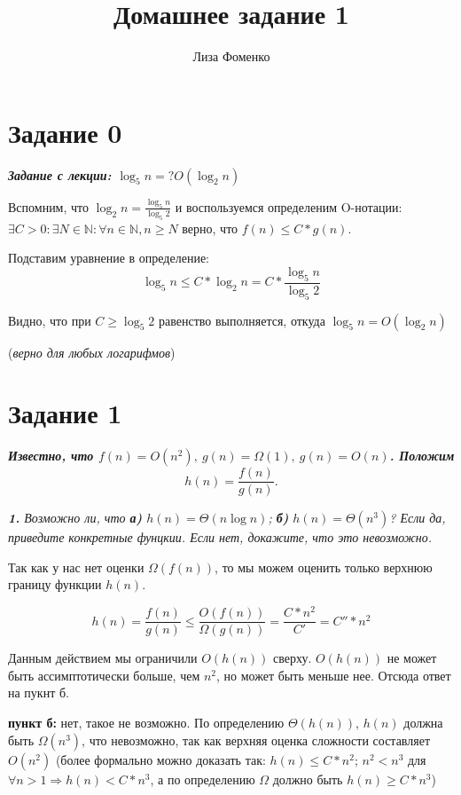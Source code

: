 \documentclass{article}
\title{Домашнее задание 1}
\author{Лиза Фоменко}
\date{}
\begin{document}
\maketitle



\section*{\textbf{Задание 0}}

\textbf{\textit{Задание с лекции: $\log_5 n =? O(\log_2 n)$}}

Вспомним, что  $\log_2 n = \frac{\log_5 n}{\log_5 2}$ и воспользуемся определеним O-нотации:
$\exists C > 0 : \exists N \in \mathbb{N} : \forall n \in \mathbb{N}, n \geq N$  верно, что $f(n) \leq C * g(n)$. 

Подставим уравнение в определение:
$$\log_5 n \leq C * \log_2 n = C * \frac{\log_5 n}{\log_5 2}$$

Видно, что при $C \geq \log_5 2$ равенство выполняется, откуда $\log_5 n = O(\log_2 n)$

(\textit{верно для любых логарифмов})

\bigskip

\section*{\textbf{Задание 1}}

\textbf{\textit{Известно, что $f(n) = O(n^2),\ g(n) = \Omega(1),\ g(n) = O(n)$. Положим $$h(n) = \frac{f(n)}{g(n)}.$$}}

\medskip

\textit{\textbf{1.} Возможно ли, что \textbf{а)} $h(n) = \Theta(n\log n)$; \textbf{б)} $h(n) = \Theta(n^3)$? Если да, приведите конкретные фунцкии. Если нет, докажите, что это невозможно.}

Так как у нас нет оценки $\Omega(f(n))$, то мы можем оценить только верхнюю границу функции $h(n)$. 

$$h(n) = \frac{f(n)}{g(n)} \leq \frac{O(f(n))}{\Omega(g(n))} = \frac{C * {n^2}}{C'} = C'' * n^2$$

Данным действием мы ограничили $O(h(n))$ сверху. $O(h(n))$ не может быть ассимптотически больше, чем $n^2$, но может быть меньше нее. Отсюда ответ на пукнт б.

\smallskip

\textbf{пункт б:} нет, такое не возможно. По определению $\Theta(h(n))$, $h(n)$ должна быть $\Omega(n^3)$, что невозможно, так как верхняя оценка сложности составляет $O(n^2)$ (более формально можно доказать так: $h(n) \leq C*n^2$; $n^2 < n^3$ для $\forall n > 1 \Rightarrow h(n) < C*n^3$, а по определению $\Omega$ должно быть $h(n) \geq C*n^3$)
\end{document}

